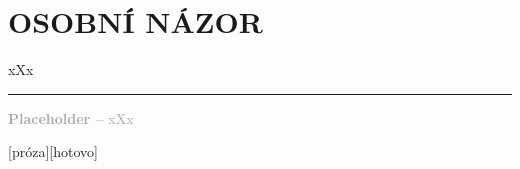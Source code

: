 \documentclass{extarticle} %
\begin{document}





\section*{OSOBNÍ NÁZOR}
\noindent 
xXx

\vfill

\noindent\begin{minipage}{\textwidth}
    \textcolor{darkgray}{\rule{\linewidth}{0.4pt}
    \footnotesize
    \textbf{Placeholder --} xXx
    }
\end{minipage}

\newpage


\changefontsize{8pt}

[próza][hotovo]
\end{document}
